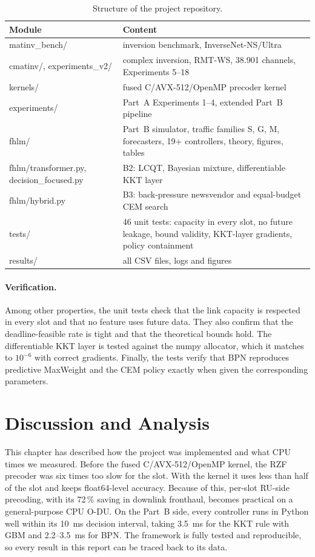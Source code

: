 \begin{table}[H]
\caption{Structure of the project repository.}
\label{tab:repo}
\centering\small
\begin{tabularx}{\textwidth}{>{\ttfamily}p{4.4cm}X}
\toprule
\normalfont Module & Content \\
\midrule
matinv\_bench/ & inversion benchmark, InverseNet-NS/Ultra \\
cmatinv/, experiments\_v2/ & complex inversion, RMT-WS, 38.901 channels, Experiments 5--18 \\
kernels/ & fused C/AVX-512/OpenMP precoder kernel \\
experiments/ & Part~A Experiments 1--4, extended Part~B pipeline \\
fhlm/ & Part~B simulator, traffic families S, G, M, forecasters, 19+ controllers, theory, figures, tables \\
fhlm/transformer.py, decision\_focused.py & B2: LCQT, Bayesian mixture, differentiable KKT layer \\
fhlm/hybrid.py & B3: back-pressure newsvendor and equal-budget CEM search \\
tests/ & 46 unit tests: capacity in every slot, no future leakage, bound validity, KKT-layer gradients, policy containment \\
results/ & all CSV files, logs and figures \\
\bottomrule
\end{tabularx}
\end{table}

\paragraph{Verification.} Among other properties, the unit tests check that the link capacity is respected in every slot and that no feature uses future data. They also confirm that the deadline-feasible rate is tight and that the theoretical bounds hold. The differentiable KKT layer is tested against the numpy allocator, which it matches to $10^{-6}$ with correct gradients. Finally, the tests verify that BPN reproduces predictive MaxWeight and the CEM policy exactly when given the corresponding parameters.

\section{Discussion and Analysis}

This chapter has described how the project was implemented and what CPU times we measured. Before the fused C/AVX-512/OpenMP kernel, the RZF precoder was six times too slow for the slot. With the kernel it uses less than half of the slot and keeps float64-level accuracy. Because of this, per-slot RU-side precoding, with its 72\,\% saving in downlink fronthaul, becomes practical on a general-purpose CPU O-DU. On the Part~B side, every controller runs in Python well within its 10~ms decision interval, taking 3.5~ms for the KKT rule with GBM and 2.2--3.5~ms for BPN. The framework is fully tested and reproducible, so every result in this report can be traced back to its data.
